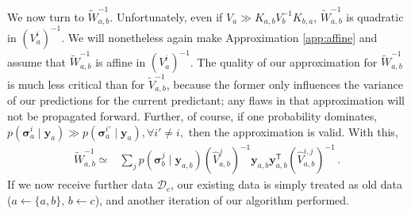 \documentclass{article} %
\newcommand{\given}{\!\ensuremath{\mid}\!}
\newcommand{\cm}[1]{\ensuremath{\mathcal{#1}}}
\newcommand{\bm}[1]{\ensuremath{\mathbf{#1}}}
\newcommand{\data}{\ensuremath{\cm{D}}}
\newcommand{\vect}[1]{\bm{#1}}
\newcommand{\vy}{\vect{y}}
\newcommand{\vs}{\vect{\sigma}}
\newcommand{\fPr}{p}
\newcommand{\Prob}[2]{\fPr(#1 \given #2 )}
\newcommand{\tr}{\ensuremath{\mathsf{T}}}
\begin{document}
We now turn to $\tilde{W}_{a,b}^{-1}$. Unfortunately, even if
$V_a \gg K_{a,b} V_b^{-1} K_{b,a}$, $\tilde{W}_{a,b}^{-1}$ is quadratic in
$(V^i_a)^{-1}$. We will nonetheless again make Approximation \ref{app:affine} and assume that $\tilde{W}_{a,b}^{-1}$
is affine in $(V^i_a)^{-1}$. The quality of our approximation for
$\tilde{W}_{a,b}^{-1}$ is much less critical than for
$\tilde{V}^{-1}_{a,b}$, because the former only influences the
variance of our predictions for the current predictant; any flaws in
that approximation will not be propagated forward. Further, of course,
if one probability dominates, 
$
\Prob{\vs^i_{a}}{\vy_{a}}\gg
\Prob{\vs^{i'}_{a}}{\vy_{a}}, \forall i' \neq i,
$
then the approximation is valid. With this,
\begin{align*}
\tilde{W}^{-1}_{a,b} \simeq
& \sum_{j} \Prob{\vs^j_{b}}{\vy_{a,b}} (\hat{V}_{a,b}^{j})^{-1}\vy_{a,b}^{\phantom{\tr}} \vy_{a,b}^\tr (\hat{V}_{a,b}^{i,j})^{-1}\,.%
\end{align*}
If we now receive further data $\data_c$, our existing data is simply treated as old data ($a \leftarrow \{a,b\}$, $b \leftarrow c$), and another iteration of our algorithm performed.
\end{document}
